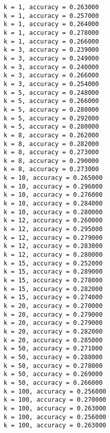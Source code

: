 \documentclass[11pt]{article}
\begin{document}
    \begin{Verbatim}[commandchars=\\\{\}]
k = 1, accuracy = 0.263000
k = 1, accuracy = 0.257000
k = 1, accuracy = 0.264000
k = 1, accuracy = 0.278000
k = 1, accuracy = 0.266000
k = 3, accuracy = 0.239000
k = 3, accuracy = 0.249000
k = 3, accuracy = 0.240000
k = 3, accuracy = 0.266000
k = 3, accuracy = 0.254000
k = 5, accuracy = 0.248000
k = 5, accuracy = 0.266000
k = 5, accuracy = 0.280000
k = 5, accuracy = 0.292000
k = 5, accuracy = 0.280000
k = 8, accuracy = 0.262000
k = 8, accuracy = 0.282000
k = 8, accuracy = 0.273000
k = 8, accuracy = 0.290000
k = 8, accuracy = 0.273000
k = 10, accuracy = 0.265000
k = 10, accuracy = 0.296000
k = 10, accuracy = 0.276000
k = 10, accuracy = 0.284000
k = 10, accuracy = 0.280000
k = 12, accuracy = 0.260000
k = 12, accuracy = 0.295000
k = 12, accuracy = 0.279000
k = 12, accuracy = 0.283000
k = 12, accuracy = 0.280000
k = 15, accuracy = 0.252000
k = 15, accuracy = 0.289000
k = 15, accuracy = 0.278000
k = 15, accuracy = 0.282000
k = 15, accuracy = 0.274000
k = 20, accuracy = 0.270000
k = 20, accuracy = 0.279000
k = 20, accuracy = 0.279000
k = 20, accuracy = 0.282000
k = 20, accuracy = 0.285000
k = 50, accuracy = 0.271000
k = 50, accuracy = 0.288000
k = 50, accuracy = 0.278000
k = 50, accuracy = 0.269000
k = 50, accuracy = 0.266000
k = 100, accuracy = 0.256000
k = 100, accuracy = 0.270000
k = 100, accuracy = 0.263000
k = 100, accuracy = 0.256000
k = 100, accuracy = 0.263000
    \end{Verbatim}
\end{document}
